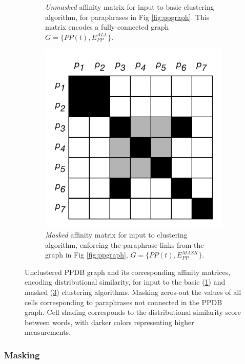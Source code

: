 \documentclass[11pt]{article}
\begin{document}
\begin{figure}
\begin{subfigure}[t]{0.36\textwidth}
		\caption{\textit{Unmasked} affinity matrix for input to basic clustering algorithm, for paraphrases in Fig \ref{fig:ppgraph}. This matrix encodes a fully-connected graph $G = \{PP(t), E_{PP}^{ALL}\}$.}
		\label{fig:ppmatall}
	\end{subfigure}
	\hfill%
	\begin{subfigure}[t]{0.36\textwidth}
		\includegraphics[width=\textwidth]{images/pp_mat_mask.pdf}
		\caption{\textit{Masked} affinity matrix for input to clustering algorithm, enforcing the paraphrase links from the graph in Fig \ref{fig:ppgraph}, $G = \{PP(t), E_{PP}^{MASK}\}$.}
		\label{fig:ppmatmask}
	\end{subfigure}
	\caption{Unclustered PPDB graph and its corresponding affinity matrices, encoding distributional similarity, for input to the basic (\ref{fig:ppmatall}) and masked (\ref{fig:ppmatmask}) clustering algorithms. Masking zeros-out the values of all cells corresponding to paraphrases not connected in the PPDB graph. Cell shading corresponds to the distributional similarity score between words, with darker colors representing higher measurements. }
\end{figure}

\subsubsection{Masking}
\end{document}
